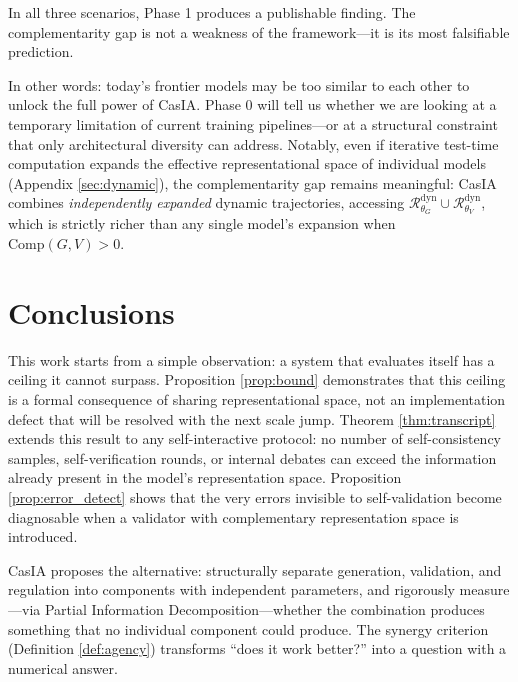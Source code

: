 \documentclass[11pt,a4paper]{article}
\theoremstyle{remark}
\begin{document}
In all three scenarios, Phase 1 produces a publishable finding. The complementarity gap is not a weakness of the framework---it is its most falsifiable prediction.

In other words: today's frontier models may be too similar to each other to unlock the full power of CasIA. Phase 0 will tell us whether we are looking at a temporary limitation of current training pipelines---or at a structural constraint that only architectural diversity can address. Notably, even if iterative test-time computation expands the effective representational space of individual models (Appendix \ref{sec:dynamic}), the complementarity gap remains meaningful: CasIA combines \emph{independently expanded} dynamic trajectories, accessing $\mathcal{R}_{\theta_G}^{\mathrm{dyn}} \cup \mathcal{R}_{\theta_V}^{\mathrm{dyn}}$, which is strictly richer than any single model's expansion when $\mathrm{Comp}(G, V) > 0$.

\section{Conclusions}
\label{sec:conclusions}

This work starts from a simple observation: a system that evaluates itself has a ceiling it cannot surpass. Proposition \ref{prop:bound} demonstrates that this ceiling is a formal consequence of sharing representational space, not an implementation defect that will be resolved with the next scale jump. Theorem \ref{thm:transcript} extends this result to any self-interactive protocol: no number of self-consistency samples, self-verification rounds, or internal debates can exceed the information already present in the model's representation space. Proposition \ref{prop:error_detect} shows that the very errors invisible to self-validation become diagnosable when a validator with complementary representation space is introduced.

CasIA proposes the alternative: structurally separate generation, validation, and regulation into components with independent parameters, and rigorously measure---via Partial Information Decomposition---whether the combination produces something that no individual component could produce. The synergy criterion (Definition \ref{def:agency}) transforms ``does it work better?'' into a question with a numerical answer.
\end{document}
